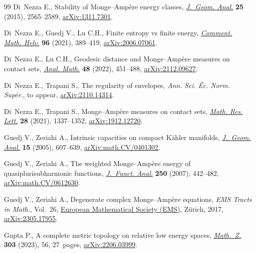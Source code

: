 \documentclass[pdftex]{sigma}
\numberwithin{equation}{section}
\theoremstyle{plain}
\begin{document}
\begin{thebibliography}{99}
Di~Nezza E., Stability of {M}onge--{A}mp\`ere energy classes, \href{https://doi.org/10.1007/s12220-014-9526-x}{\textit{J.~Geom.
 Anal.}} \textbf{25} (2015), 2565--2589, \href{https://arxiv.org/abs/1311.7301}{arXiv:1311.7301}.

Di~Nezza E., Guedj V., Lu C.H., Finite entropy vs finite energy,
 \href{https://doi.org/10.4171/cmh/515}{\textit{Comment. Math. Helv.}} \textbf{96} (2021), 389--419,
 \href{https://arxiv.org/abs/2006.07061}{arXiv:2006.07061}.

Di~Nezza E., Lu C.H., Geodesic distance and {M}onge--{A}mp\`ere measures on
 contact sets, \href{https://doi.org/10.1007/s10476-022-0159-1}{\textit{Anal. Math.}} \textbf{48} (2022), 451--488,
 \href{https://arxiv.org/abs/2112.09627}{arXiv:2112.09627}.

Di~Nezza E., Trapani S., The regularity of envelopes, \textit{Ann. Sci. \'Ec.
 Norm. Sup\'er.}, {t}o appear, \href{https://arxiv.org/abs/2110.14314}{arXiv:2110.14314}.

Di~Nezza E., Trapani S., Monge--{A}mp\`ere measures on contact sets,
 \href{https://doi.org/10.4310/MRL.2021.v28.n5.a3}{\textit{Math. Res. Lett.}} \textbf{28} (2021), 1337--1352,
 \href{https://arxiv.org/abs/1912.12720}{arXiv:1912.12720}.

Guedj V., Zeriahi A., Intrinsic capacities on compact {K}\"ahler manifolds,
 \href{https://doi.org/10.1007/BF02922247}{\textit{J.~Geom. Anal.}} \textbf{15} (2005), 607--639,
 \href{https://arxiv.org/abs/math.CV/0401302}{arXiv:math.CV/0401302}.

Guedj V., Zeriahi A., The weighted {M}onge--{A}mp\`ere energy of
 quasiplurisubharmonic functions, \href{https://doi.org/10.1016/j.jfa.2007.04.018}{\textit{J.~Funct. Anal.}} \textbf{250}
 (2007), 442--482, \href{https://arxiv.org/abs/math.CV/0612630}{arXiv:math.CV/0612630}.

Guedj V., Zeriahi A., Degenerate complex {M}onge--{A}mp\`ere equations,
 \textit{EMS Tracts in Math.}, Vol.~26, \href{https://doi.org/10.4171/167}{European Mathematical Society (EMS)},
 Z\"urich, 2017, \href{https://arxiv.org/abs/2305.17955}{arXiv:2305.17955}.

Gupta P., A complete metric topology on relative low energy spaces,
 \href{https://doi.org/10.1007/s00209-023-03218-5}{\textit{Math.~Z.}} \textbf{303} (2023), 56, 27~pages, \href{https://arxiv.org/abs/2206.03999}{arXiv:2206.03999}.


\end{thebibliography}
\end{document}
